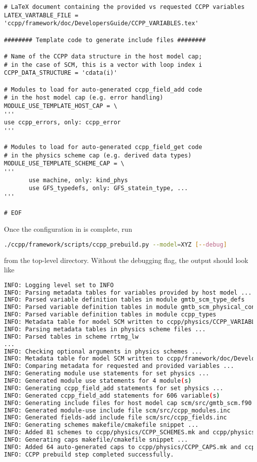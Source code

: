 \begin{lstlisting}
# LaTeX document containing the provided vs requested CCPP variables
LATEX_VARTABLE_FILE = 'ccpp/framework/doc/DevelopersGuide/CCPP_VARIABLES.tex'

######## Template code to generate include files ########

# Name of the CCPP data structure in the host model cap;
# in the case of SCM, this is a vector with loop index i
CCPP_DATA_STRUCTURE = 'cdata(i)'

# Modules to load for auto-generated ccpp_field_add code
# in the host model cap (e.g. error handling)
MODULE_USE_TEMPLATE_HOST_CAP = \
'''
use ccpp_errors, only: ccpp_error
'''

# Modules to load for auto-generated ccpp_field_get code
# in the physics scheme cap (e.g. derived data types)
MODULE_USE_TEMPLATE_SCHEME_CAP = \
'''
       use machine, only: kind_phys
       use GFS_typedefs, only: GFS_statein_type, ...
'''

# EOF
\end{lstlisting}
\clearpage

Once the configuration in  is complete, run
\begin{lstlisting}[language=bash]
./ccpp/framework/scripts/ccpp_prebuild.py --model=XYZ [--debug]
\end{lstlisting}
from the top-level directory. Without the debugging flag, the output should look like
\begin{lstlisting}[language=bash,basicstyle=\scriptsize\ttfamily]
INFO: Logging level set to INFO
INFO: Parsing metadata tables for variables provided by host model ...
INFO: Parsed variable definition tables in module gmtb_scm_type_defs
INFO: Parsed variable definition tables in module gmtb_scm_physical_constants
INFO: Parsed variable definition tables in module ccpp_types
INFO: Metadata table for model SCM written to ccpp/physics/CCPP_VARIABLES_SCM.html
INFO: Parsing metadata tables in physics scheme files ...
INFO: Parsed tables in scheme rrtmg_lw
...
INFO: Checking optional arguments in physics schemes ...
INFO: Metadata table for model SCM written to ccpp/framework/doc/DevelopersGuide/CCPP_VARIABLES_SCM.tex
INFO: Comparing metadata for requested and provided variables ...
INFO: Generating module use statements for set physics ...
INFO: Generated module use statements for 4 module(s)
INFO: Generating ccpp_field_add statements for set physics ...
INFO: Generated ccpp_field_add statements for 606 variable(s)
INFO: Generating include files for host model cap scm/src/gmtb_scm.f90 ...
INFO: Generated module-use include file scm/src/ccpp_modules.inc
INFO: Generated fields-add include file scm/src/ccpp_fields.inc
INFO: Generating schemes makefile/cmakefile snippet ...
INFO: Added 81 schemes to ccpp/physics/CCPP_SCHEMES.mk and ccpp/physics/CCPP_SCHEMES.cmake
INFO: Generating caps makefile/cmakefile snippet ...
INFO: Added 64 auto-generated caps to ccpp/physics/CCPP_CAPS.mk and ccpp/physics/CCPP_CAPS.cmake
INFO: CCPP prebuild step completed successfully.
\end{lstlisting}

